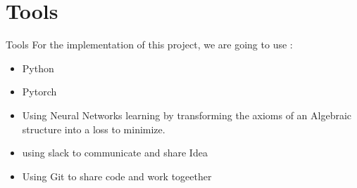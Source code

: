 \documentclass{beamer}
\begin{document}
    \section{Tools}
    \begin{frame}{Tools}
        For the implementation of this project, we are going to use :
        \begin{itemize}
            \item Python
            \item Pytorch
            \item Using Neural Networks learning by transforming the axioms of
            an Algebraic structure into a loss to minimize.
            \item using slack to communicate and share Idea
            \item Using Git to share code and work togeether
        \end{itemize}
    \end{frame}
\end{document}

